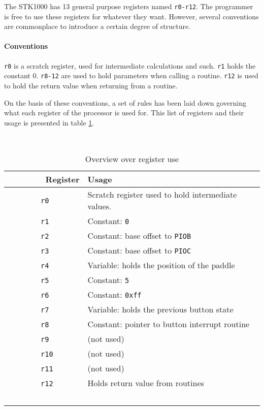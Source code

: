 The STK1000 has 13 general purpose registers named \texttt{r0-r12}. The programmer is free to use these registers for whatever they want.
However, several conventions are commonplace to introduce a certain degree of structure.

\paragraph{Conventions}
\texttt{r0} is a scratch register, used for intermediate calculations and such.
\texttt{r1} holds the constant 0.
\texttt{r8-12} are used to hold parameters when calling a routine.
\texttt{r12} is used to hold the return value when returning from a routine.

On the basis of these conventions, a set of rules has been laid down governing what each register of the processor is used for.
This list of registers and their usage is presented in table \ref{register-table}.

\begin{table}
    \centering
    \begin{tabular}{|l|l|}
        \hline
        Register  & Usage \\
        \hline
        \hline
        \texttt{r0}  & Scratch register used to hold intermediate values. \\
        \hline
        \texttt{r1}  & Constant: \texttt{0} \\ 
        \hline
        \texttt{r2}  & Constant: base offset to \texttt{PIOB} \\ 
        \hline
        \texttt{r3}  & Constant: base offset to \texttt{PIOC} \\ 
        \hline
        \texttt{r4}  & Variable: holds the position of the paddle \\ 
        \hline
        \texttt{r5}  & Constant: \texttt{5} \\ 
        \hline
        \texttt{r6}  & Constant: \texttt{0xff} \\ 
        \hline
        \texttt{r7}  & Variable: holds the previous button state \\ 
        \hline
        \texttt{r8}  & Constant: pointer to button interrupt routine \\ 
        \hline
        \texttt{r9}  & (not used) \\ 
        \hline
        \texttt{r10} & (not used) \\ 
        \hline
        \texttt{r11} & (not used) \\ 
        \hline
        \texttt{r12} & Holds return value from routines \\
        \hline
    \end{tabular}
    \caption{Overview over register use}
    \label{register-table}
\end{table}

